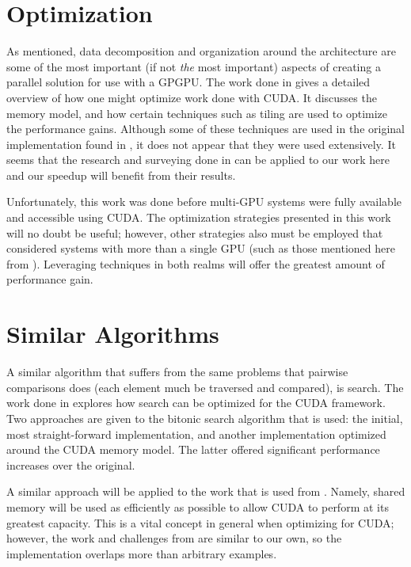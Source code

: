 \documentclass[12pt]{ucthesis}
\begin{document}
\section{Optimization}
As mentioned, data decomposition and organization around the architecture are
some of the most important (if not \emph{the} most important) aspects of
creating a parallel solution for use with a GPGPU. The work done in
\cite{ryoo2008optimization} gives a detailed overview of how one might optimize
work done with CUDA. It discusses the memory model, and how certain techniques
such as tiling are used to optimize the performance gains. Although some of
these techniques are used in the original implementation found in
\cite{scharfglass2012breaking}, it does not appear that they were used extensively.
It seems that the research and surveying done in \cite{ryoo2008optimization}
can be applied to our work here and our speedup will benefit from their results.

Unfortunately, this work was done before multi-GPU systems were fully available
and accessible using CUDA. The optimization strategies presented in this work
will no doubt be useful; however, other strategies also must be employed that
considered systems with more than a single GPU (such as those mentioned here
from \cite{thibault2009cuda}). Leveraging techniques in both realms will offer
the greatest amount of performance gain.

\section{Similar Algorithms}
A similar algorithm that suffers from the same problems that pairwise
comparisons does (each element much be traversed and compared), is search. The
work done in \cite{peters2011fast} explores how search can be optimized for the
CUDA framework. Two approaches are given to the bitonic search algorithm that
is used: the initial, most straight-forward implementation, and another
implementation optimized around the CUDA memory model. The latter offered
significant performance increases over the original. 

A similar approach will be applied to the work that is used from
\cite{scharfglass2012breaking}. Namely, shared memory will be used as efficiently
as possible to allow CUDA to perform at its greatest capacity. This is a vital
concept in general when optimizing for CUDA; however, the work and challenges
from \cite{peters2011fast} are similar to our own, so the implementation
overlaps more than arbitrary examples.
\end{document}
